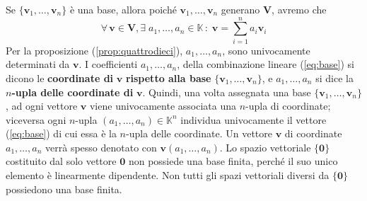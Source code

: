 \documentclass{article}
\theoremstyle{plain}
\theoremstyle{definition}
\theoremstyle{remark}
\begin{document}
Se \( \{\mathbf{v}_1, \ldots, \mathbf{v}_n\} \) è una base, allora poiché \( \mathbf{v}_1, \ldots, \mathbf{v}_n \) generano \( \mathbf{V} \), avremo che 
\begin{equation}
    \forall\,\mathbf{v} \in \mathbf{V},\exists\; a_1, \ldots, a_n \in \mathbb{K}\,:\;\mathbf{v} = \sum_{i=1}^{n}a_i\mathbf{v}_i  \label{eq:base}
\end{equation}
Per la proposizione (\ref{prop:quattrodieci}), \( a_1, \ldots, a_n \), sono univocamente determinati da \( \mathbf{v} \). 
I coefficienti \( a_1, \ldots, a_n \), della combinazione lineare (\ref{eq:base}) si dicono le \textbf{coordinate di} \( \mathbf{v} \) \textbf{rispetto alla base} \( \{\mathbf{v}_1, \ldots, \mathbf{v}_n\} \), e \( a_1, \ldots, a_n \) si dice la \( n \)\textbf{-upla delle coordinate di} \( \mathbf{v} \). 
Quindi, una volta assegnata una base \( \{\mathbf{v}_1, \ldots, \mathbf{v}_n\} \), ad ogni vettore \( \mathbf{v} \) viene univocamente associata una \( n \)-upla di coordinate; 
viceversa ogni \( n \)-upla \( (a_1, \ldots, a_n) \in\mathbb{K}^n\) individua univocamente il vettore (\ref{eq:base}) di cui essa è la \( n \)-upla delle coordinate.
Un vettore \( \mathbf{v} \) di coordinate \( a_1, \ldots, a_n \) verrà spesso denotato con \( \mathbf{v}(a_1, \ldots, a_n) \). 
Lo spazio vettoriale \( \{\mathbf{0}\} \) costituito dal solo vettore $\mathbf{0}$ non possiede una base finita, perché il suo unico elemento è linearmente dipendente. 
Non tutti gli spazi vettoriali diversi da \( \{\mathbf{0}\} \) possiedono una base finita.

\vspace{10pt}
\end{document}
